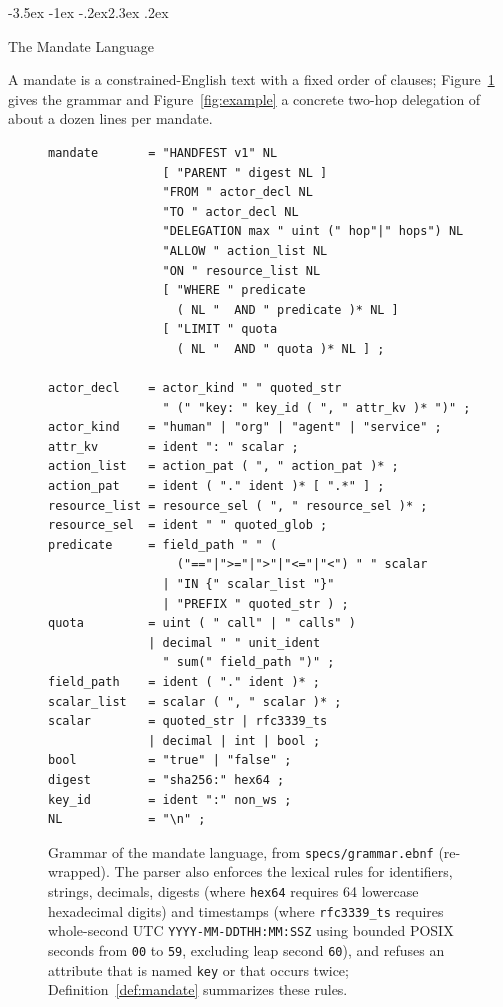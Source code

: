 \documentclass[10pt,twocolumn]{article}
\makeatletter
\theoremstyle{plain}
\theoremstyle{definition}
\renewcommand\section{\@startsection{section}{1}{\z@}%
  {-3.5ex \@plus -1ex \@minus -.2ex}{2.3ex \@plus .2ex}%
  {\normalfont\Large\bfseries\raggedright}}
\makeatother
\begin{document}
\section{The Mandate Language}
\label{sec:language}

A mandate is a constrained-English text with a fixed order of clauses; Figure~\ref{fig:grammar} gives the grammar and Figure~\ref{fig:example} a concrete two-hop delegation of about a dozen lines per mandate.

\begin{figure}[t]
\begin{lstlisting}
mandate       = "HANDFEST v1" NL
                [ "PARENT " digest NL ]
                "FROM " actor_decl NL
                "TO " actor_decl NL
                "DELEGATION max " uint (" hop"|" hops") NL
                "ALLOW " action_list NL
                "ON " resource_list NL
                [ "WHERE " predicate
                  ( NL "  AND " predicate )* NL ]
                [ "LIMIT " quota
                  ( NL "  AND " quota )* NL ] ;

actor_decl    = actor_kind " " quoted_str
                " (" "key: " key_id ( ", " attr_kv )* ")" ;
actor_kind    = "human" | "org" | "agent" | "service" ;
attr_kv       = ident ": " scalar ;
action_list   = action_pat ( ", " action_pat )* ;
action_pat    = ident ( "." ident )* [ ".*" ] ;
resource_list = resource_sel ( ", " resource_sel )* ;
resource_sel  = ident " " quoted_glob ;
predicate     = field_path " " (
                  ("=="|">="|">"|"<="|"<") " " scalar
                | "IN {" scalar_list "}"
                | "PREFIX " quoted_str ) ;
quota         = uint ( " call" | " calls" )
              | decimal " " unit_ident
                " sum(" field_path ")" ;
field_path    = ident ( "." ident )* ;
scalar_list   = scalar ( ", " scalar )* ;
scalar        = quoted_str | rfc3339_ts
              | decimal | int | bool ;
bool          = "true" | "false" ;
digest        = "sha256:" hex64 ;
key_id        = ident ":" non_ws ;
NL            = "\n" ;
\end{lstlisting}
\caption{Grammar of the mandate language, from \texttt{specs/grammar.ebnf} (re-wrapped). The parser also enforces the lexical rules for identifiers, strings, decimals, digests (where \texttt{hex64} requires 64 lowercase hexadecimal digits) and timestamps (where \texttt{rfc3339\_ts} requires whole-second UTC \texttt{YYYY-MM-DDTHH:MM:SSZ} using bounded POSIX seconds from \texttt{00} to \texttt{59}, excluding leap second \texttt{60}), and refuses an attribute that is named \texttt{key} or that occurs twice; Definition~\ref{def:mandate} summarizes these rules.}
\label{fig:grammar}
\end{figure}
\end{document}
